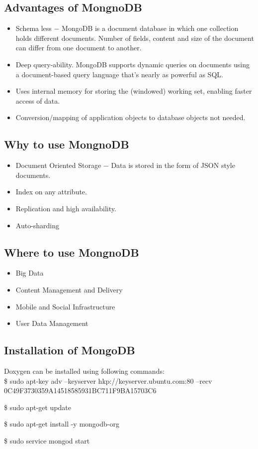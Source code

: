 \subsection{Advantages of MongnoDB}
\begin{itemize}
\item Schema less − MongoDB is a document database in which one collection holds different documents. Number of fields, content and size of the document can differ from one document to another.
\item Deep query-ability. MongoDB supports dynamic queries on documents using a document-based query language that's nearly as powerful as SQL.
\item Uses internal memory for storing the (windowed) working set, enabling faster access of data.
\item Conversion/mapping of application objects to database objects not needed.
\end{itemize}

\subsection{Why to use MongnoDB}
\begin{itemize}
\item Document Oriented Storage − Data is stored in the form of JSON style documents.
\item Index on any attribute.
\item Replication and high availability.
\item Auto-sharding
\end{itemize}

\subsection{Where to use MongnoDB}
\begin{itemize}
\item Big Data
\item Content Management and Delivery
\item Mobile and Social Infrastructure
\item User Data Management
\end{itemize}

\subsection{Installation of MongoDB}
Doxygen can be installed using following commands:\\

\hspace{4pt} \$ sudo apt-key adv --keyserver hkp://keyserver.ubuntu.com:80 --recv 0C49F3730359A14518585931BC711F9BA15703C6

\hspace{4pt} \$ sudo apt-get update

\hspace{4pt} \$ sudo apt-get install -y mongodb-org

\hspace{4pt} \$ sudo service mongod start
